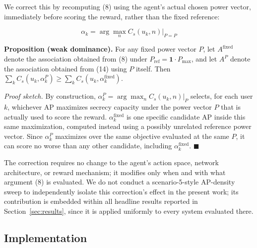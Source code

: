 \documentclass[conference]{IEEEtran}
\begin{document}
We correct this by recomputing (8) using the agent's actual chosen power vector, immediately before scoring the reward, rather than the fixed reference:

\begin{equation}
\alpha_k=
\arg\max_n
C_s(u_k,n)\big|_{P=P}
\end{equation}

\textbf{Proposition (weak dominance).} For any fixed power vector $P$, let $A^{\text{fixed}}$ denote the association obtained from (8) under $P_{\text{ref}} = \mathbf{1}\cdot P_{\max}$, and let $A^{P}$ denote the association obtained from (14) using $P$ itself. Then $\sum_k C_s(u_k, \alpha_k^P) \geq \sum_k C_s(u_k, \alpha_k^{\text{fixed}})$.

\emph{Proof sketch.} By construction, $\alpha_k^P = \arg\max_n C_s(u_k,n)|_{P}$ selects, for each user $k$, whichever AP maximizes secrecy capacity under the power vector $P$ that is actually used to score the reward. $\alpha_k^{\text{fixed}}$ is one specific candidate AP inside this same maximization, computed instead using a possibly unrelated reference power vector. Since $\alpha_k^P$ maximizes over the same objective evaluated at the same $P$, it can score no worse than any other candidate, including $\alpha_k^{\text{fixed}}$. $\blacksquare$

The correction requires no change to the agent's action space, network architecture, or reward mechanism; it modifies only when and with what argument (8) is evaluated. We do not conduct a scenario-5-style AP-density sweep to independently isolate this correction's effect in the present work; its contribution is embedded within all headline results reported in Section~\ref{sec:results}, since it is applied uniformly to every system evaluated there.

\subsection{Implementation}
\end{document}
